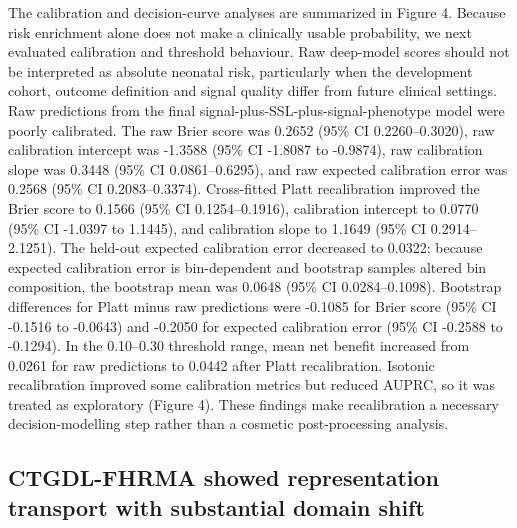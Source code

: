 \documentclass[utf8]{FrontiersinHarvard}
\begin{document}
The calibration and decision-curve analyses are summarized in Figure 4. Because risk enrichment alone does not make a clinically usable probability, we next evaluated calibration and threshold behaviour. Raw deep-model scores should not be interpreted as absolute neonatal risk, particularly when the development cohort, outcome definition and signal quality differ from future clinical settings. Raw predictions from the final signal-plus-SSL-plus-signal-phenotype model were poorly calibrated. The raw Brier score was 0.2652 (95\% CI 0.2260--0.3020), raw calibration intercept was -1.3588 (95\% CI -1.8087 to -0.9874), raw calibration slope was 0.3448 (95\% CI 0.0861--0.6295), and raw expected calibration error was 0.2568 (95\% CI 0.2083--0.3374). Cross-fitted Platt recalibration improved the Brier score to 0.1566 (95\% CI 0.1254--0.1916), calibration intercept to 0.0770 (95\% CI -1.0397 to 1.1445), and calibration slope to 1.1649 (95\% CI 0.2914--2.1251). The held-out expected calibration error decreased to 0.0322; because expected calibration error is bin-dependent and bootstrap samples altered bin composition, the bootstrap mean was 0.0648 (95\% CI 0.0284--0.1098). Bootstrap differences for Platt minus raw predictions were -0.1085 for Brier score (95\% CI -0.1516 to -0.0643) and -0.2050 for expected calibration error (95\% CI -0.2588 to -0.1294). In the 0.10--0.30 threshold range, mean net benefit increased from 0.0261 for raw predictions to 0.0442 after Platt recalibration. Isotonic recalibration improved some calibration metrics but reduced AUPRC, so it was treated as exploratory (Figure 4). These findings make recalibration a necessary decision-modelling step rather than a cosmetic post-processing analysis.


\subsection{CTGDL-FHRMA showed representation transport with substantial domain shift}
\end{document}
